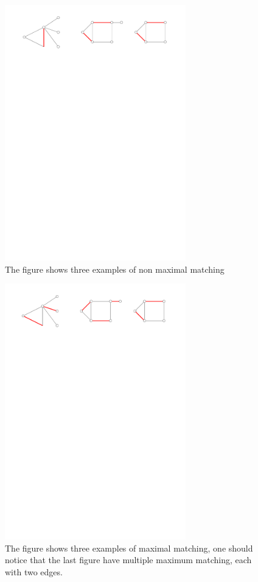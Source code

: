\begin{figure}[H]
	\centering
	\includegraphics[width=0.7\textwidth]{figures/imperfectmatching.pdf}
	\caption{The figure shows three examples of non maximal matching}
	\label{fig:imperfectmatching}
\end{figure}

\begin{figure}[H]
	\centering
	\includegraphics[width=0.7\textwidth]{figures/perfectmatching.pdf}
	\caption{The figure shows three examples of maximal matching, one should notice that the last 
    		 figure have multiple maximum matching, each with two edges.}
	\label{fig:perfectmatching}
\end{figure}

